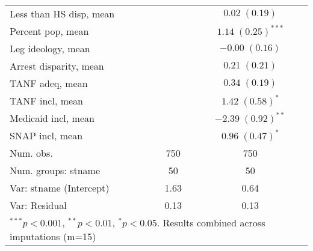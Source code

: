 \begin{table}
\begin{center}
\begin{tabular}{l c c }
Less than HS disp, mean    &                         & $0.02 \; (0.19)$        \\
Percent pop, mean          &                         & $1.14 \; (0.25)^{***}$  \\
Leg ideology, mean         &                         & $-0.00 \; (0.16)$       \\
Arrest disparity, mean     &                         & $0.21 \; (0.21)$        \\
TANF adeq, mean            &                         & $0.34 \; (0.19)$        \\
TANF incl, mean            &                         & $1.42 \; (0.58)^{*}$    \\
Medicaid incl, mean        &                         & $-2.39 \; (0.92)^{**}$  \\
SNAP incl, mean            &                         & $0.96 \; (0.47)^{*}$    \\
\hline
Num. obs.                  & 750                     & 750                     \\
Num. groups: stname        & 50                      & 50                      \\
Var: stname (Intercept)    & 1.63                    & 0.64                    \\
Var: Residual              & 0.13                    & 0.13                    \\
\hline
\multicolumn{3}{l}{\scriptsize{$^{***}p<0.001$, $^{**}p<0.01$, $^*p<0.05$. Results combined across imputations (m=15)}}
\end{tabular}
\label{table:coefficients}
\end{center}
\end{table}
